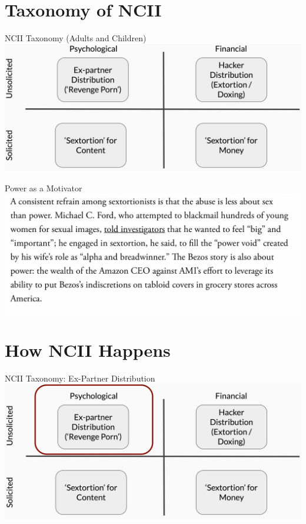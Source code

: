 \documentclass[nobackground,dvipsnames,table,aspectratio=169]{beamer}
\begin{document}
\section{Taxonomy of NCII}

\begin{frame}{NCII Taxonomy (Adults and Children)}
    \includegraphics[width=\textwidth]{ncii-taxonomy-1}
\end{frame}

\begin{frame}{Power as a Motivator}
    \includegraphics[width=\textwidth]{power-as-motive}
\end{frame}

\section{How NCII Happens}

\begin{frame}{NCII Taxonomy: Ex-Partner Distribution}
    \includegraphics[width=\textwidth]{ncii-taxonomy-2}
\end{frame}
\end{document}
